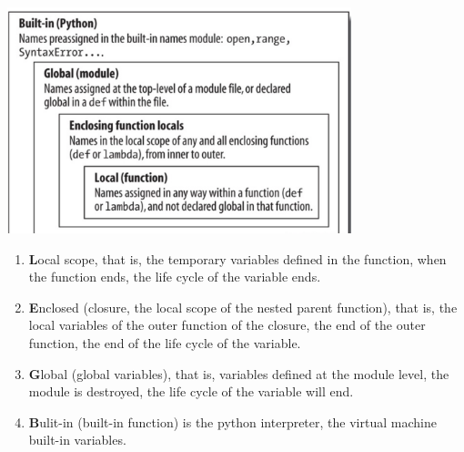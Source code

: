 \documentclass[a4paper]{exam}
\begin{document}
\includegraphics[width=10cm]{img/python_scope.png}
\begin{enumerate}
  \item \textbf{L}ocal scope,  that is, the temporary variables defined in the function, when the function ends, the life cycle of the variable ends.

  \item \textbf{E}nclosed (closure, the local scope of the nested parent function), that is, the local variables of the outer function of the closure, the end of the outer function, the end of the life cycle of the variable.
  \item \textbf{G}lobal (global variables), that is, variables defined at the module level, the module is destroyed, the life cycle of the variable will end.
  \item \textbf{B}ulit-in (built-in function) is the python interpreter, the virtual machine built-in variables.
\end{enumerate}
\end{document}
